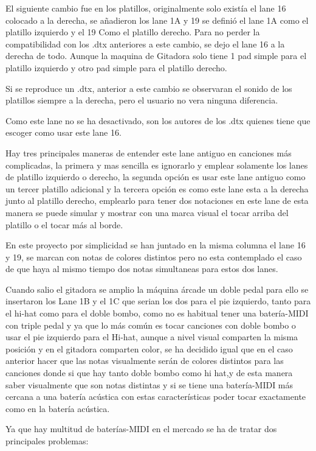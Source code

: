 \documentclass[a4paper,11pt,oneside]{book}
\begin{document}
El siguiente cambio fue en los platillos, originalmente solo existía el lane 16 colocado a la derecha, se añadieron los lane 1A y 19 se definió el lane 1A como el platillo izquierdo y el 19 Como el platillo derecho.
Para no perder la compatibilidad con los .dtx anteriores a este cambio, se dejo el lane 16 a la derecha de todo. Aunque la maquina de Gitadora solo tiene 1 pad simple para el platillo izquierdo y otro pad simple para el platillo derecho. 

Si se reproduce un .dtx, anterior a este cambio se observaran el sonido de los platillos siempre a la derecha, pero el usuario no vera ninguna diferencia.

Como este lane no se ha desactivado, son los autores de los .dtx quienes tiene que escoger como usar este lane 16. 

Hay tres principales maneras de entender este lane antiguo en canciones más complicadas, la primera y mas sencilla es ignorarlo y emplear solamente los lanes de platillo izquierdo o derecho, la segunda opción es usar este lane antiguo como un tercer platillo adicional y la tercera opción es como este lane esta a la derecha junto al platillo derecho, emplearlo para tener dos notaciones en este lane de esta manera se puede simular y mostrar con una marca visual el tocar arriba del platillo o el tocar más al borde. 


En este proyecto por simplicidad se han juntado en la misma columna el lane 16 y 19, se marcan con notas de colores distintos pero no esta contemplado el caso de que haya al mismo tiempo dos notas simultaneas para estos dos lanes.

Cuando salio el gitadora se amplio la máquina árcade un doble pedal para ello se insertaron los Lane 1B y el 1C que serian los dos para el pie izquierdo, tanto para el hi-hat como para el doble bombo, como no es habitual tener una batería-MIDI con triple pedal y ya que lo más común es tocar canciones con doble bombo o usar el pie izquierdo para el Hi-hat, aunque a nivel visual comparten la misma posición y en el gitadora comparten color, se ha decidido igual que en el caso anterior hacer que las notas visualmente serán de colores distintos para las canciones donde si que hay tanto doble bombo como hi hat,y de esta manera saber visualmente que son notas distintas y si se tiene una batería-MIDI más cercana a una batería acústica con estas características poder tocar exactamente como en la batería acústica.
 
Ya que hay multitud de baterías-MIDI en el mercado se ha de tratar dos principales problemas:
\end{document}

